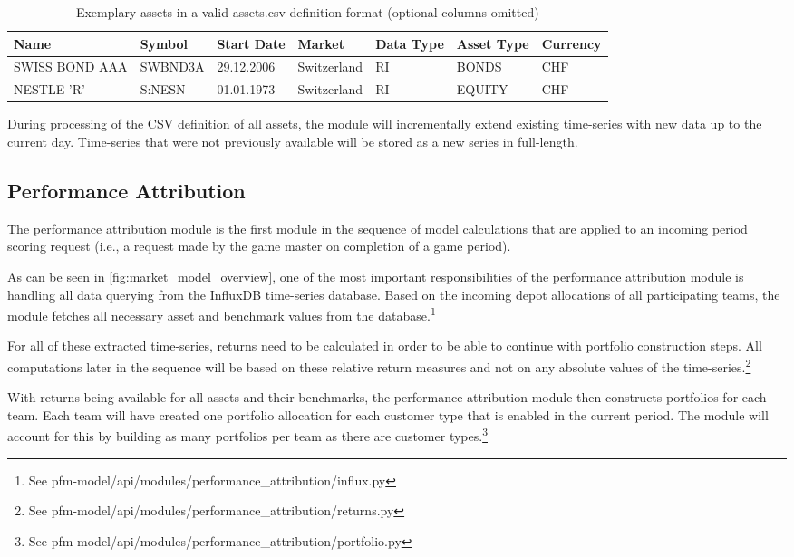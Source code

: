 \begin{table}[h!]
  \begin{tabular}{lllllll}
    \toprule
    Name & Symbol  & Start Date & Market      & Data Type & Asset Type & Currency \\
    \midrule
    SWISS BOND AAA & SWBND3A & 29.12.2006 & Switzerland & RI        & BONDS      & CHF      \\
    NESTLE 'R'     & S:NESN  & 01.01.1973 & Switzerland & RI        & EQUITY     & CHF      \\
    \bottomrule
  \end{tabular}
  \centering
  \caption{Exemplary assets in a valid assets.csv definition format (optional columns omitted)}
  \label{table:assets_csv}
\end{table}

During processing of the CSV definition of all assets, the module will incrementally extend existing time-series with new data up to the current day. Time-series that were not previously available will be stored as a new series in full-length.


\subsection{Performance Attribution}
The performance attribution module is the first module in the sequence of model calculations that are applied to an incoming period scoring request (i.e., a request made by the game master on completion of a game period).

As can be seen in \ref{fig:market_model_overview}, one of the most important responsibilities of the performance attribution module is handling all data querying from the InfluxDB time-series database. Based on the incoming depot allocations of all participating teams, the module fetches all necessary asset and benchmark values from the database.\footnote{See pfm-model/api/modules/performance\_attribution/influx.py}

For all of these extracted time-series, returns need to be calculated in order to be able to continue with portfolio construction steps. All computations later in the sequence will be based on these relative return measures and not on any absolute values of the time-series.\footnote{See pfm-model/api/modules/performance\_attribution/returns.py}

With returns being available for all assets and their benchmarks, the performance attribution module then constructs portfolios for each team. Each team will have created one portfolio allocation for each customer type that is enabled in the current period. The module will account for this by building as many portfolios per team as there are customer types.\footnote{See pfm-model/api/modules/performance\_attribution/portfolio.py}

